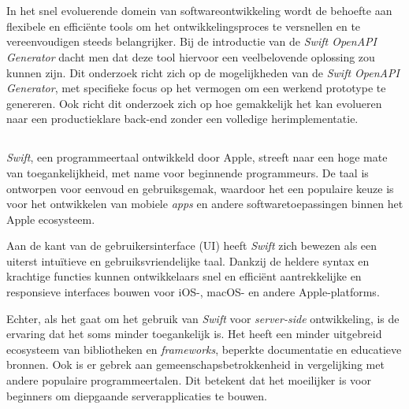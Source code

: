 
\chapter{}%
\label{ch:inleiding}

In het snel evoluerende domein van softwareontwikkeling wordt de behoefte aan flexibele en efficiënte tools om het ontwikkelingsproces te versnellen en te vereenvoudigen steeds belangrijker. Bij de introductie van de  \textit{Swift OpenAPI Generator} dacht men dat deze tool hiervoor een veelbelovende oplossing zou kunnen zijn. Dit onderzoek richt zich op de mogelijkheden van de  \textit{Swift OpenAPI Generator}, met specifieke focus op het vermogen om een werkend prototype te genereren. Ook richt dit onderzoek zich op hoe gemakkelijk het kan evolueren naar een productieklare back-end zonder een volledige herimplementatie.
\newpage


\section{}%
\label{sec:probleemstelling}

\textit{Swift}, een programmeertaal ontwikkeld door Apple, streeft naar een hoge mate van toegankelijkheid, met name voor beginnende programmeurs. De taal is ontworpen voor eenvoud en gebruiksgemak, waardoor het een populaire keuze is voor het ontwikkelen van mobiele  \textit{apps} en andere softwaretoepassingen binnen het Apple ecosysteem.

Aan de kant van de gebruikersinterface (UI) heeft \textit{Swift} zich bewezen als een uiterst intuïtieve en gebruiksvriendelijke taal. Dankzij de heldere syntax en krachtige functies kunnen ontwikkelaars snel en efficiënt aantrekkelijke en responsieve interfaces bouwen voor iOS-, macOS- en andere Apple-platforms. 

Echter, als het gaat om het gebruik van \textit{Swift} voor \textit{server-side} ontwikkeling, is de ervaring dat het soms minder toegankelijk is. Het heeft een minder uitgebreid ecosysteem van bibliotheken en \textit{frameworks}, beperkte documentatie en educatieve bronnen. Ook is er gebrek aan gemeenschapsbetrokkenheid in vergelijking met andere populaire programmeertalen. Dit betekent dat het moeilijker is voor beginners om diepgaande serverapplicaties te bouwen.

